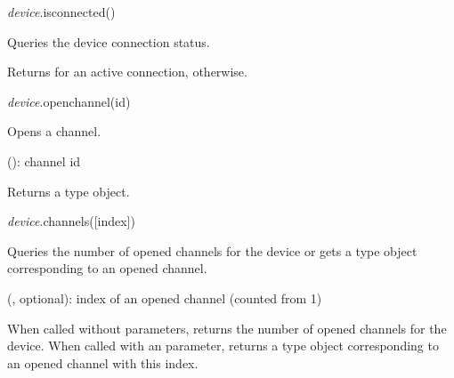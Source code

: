 \documentclass[a4paper,12pt,twoside,extrafontsizes]{memoir}
\begin{document}

\begin{luafuncprototype}
\emph{device}.isconnected()
\end{luafuncprototype}

\begin{funcdescr}
	Queries the device connection status.
\end{funcdescr}

\begin{funcret}
	Returns  for an active connection,  otherwise.
\end{funcret}


\begin{luafuncprototype}
\emph{device}.openchannel(id)
\end{luafuncprototype}

\begin{funcdescr}
	Opens a channel.
\end{funcdescr}

\begin{funcparams}
	 (): channel id
\end{funcparams}

\begin{funcret}
	Returns a  type object.
\end{funcret}


\begin{luafuncprototype}
\emph{device}.channels([index])
\end{luafuncprototype}

\begin{funcdescr}
	Queries the number of opened channels for the device or gets a  type object corresponding to an opened channel.
\end{funcdescr}

\begin{funcparams}
	 (, optional): index of an opened channel (counted from 1)
\end{funcparams}

\begin{funcret}
	When called without parameters, returns the number of opened channels for the device. When called with an  parameter, returns a  type object corresponding to an opened channel with this index.
\end{funcret}
\end{document}
